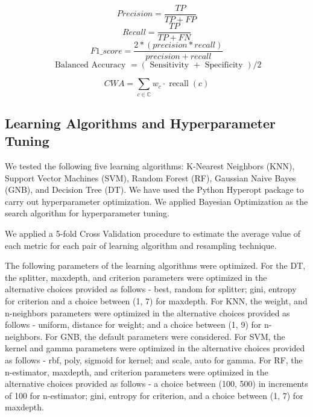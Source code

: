 \documentclass{article}
\begin{document}
\begin{equation}
  Precision = \frac{TP}{TP + FP}
  \label{pre}
\end{equation}
\begin{equation}
  Recall = \frac{TP}{ TP + FN}
  \label{re}
\end{equation}
\begin{equation}
  F1\_score = \frac{2 * (precision * recall)}{precision + recall}
  \label{eqn:f1}
\end{equation}
\begin{equation}
\text { Balanced Accuracy }=(\text { Sensitivity }+\text { Specificity }) / 2
\label{balacc}
\end{equation}

\begin{equation}
CWA=\sum_{c \in \mathbb{C}} w_{c} \cdot \operatorname{recall}(c)
\label{cwa-multi}
\end{equation}


\subsection{Learning Algorithms and Hyperparameter Tuning}\label{subsec:learners}

We tested the following five learning algorithms: K-Nearest Neighbors (KNN), Support Vector Machines (SVM), Random Forest (RF), Gaussian Naive Bayes (GNB), and Decision Tree (DT). We have used the Python Hyperopt package to carry out hyperparameter optimization. We applied Bayesian Optimization as the search algorithm for hyperparameter tuning.%

We applied a 5-fold Cross Validation procedure to estimate the average value of each metric for each pair of learning algorithm and resampling technique.


The following parameters of the learning algorithms were optimized. For the DT, the splitter, maxdepth, and criterion parameters were optimized in the alternative choices provided as follows - best, random for splitter; gini, entropy for criterion and a choice between (1, 7) for maxdepth. For KNN, the weight, and n-neighbors parameters were optimized in the alternative choices provided as follows - uniform, distance for weight; and a choice between (1, 9) for n-neighbors. For GNB, the default parameters were considered. For SVM, the kernel and gamma parameters were optimized in the alternative choices provided as follows - rbf, poly, sigmoid for kernel; and scale, auto for gamma. For RF, the n-estimator, maxdepth, and criterion parameters were optimized in the alternative choices provided as follows - a choice between (100, 500) in increments of 100 for n-estimator; gini, entropy for criterion, and a choice between (1, 7) for maxdepth.
\end{document}
